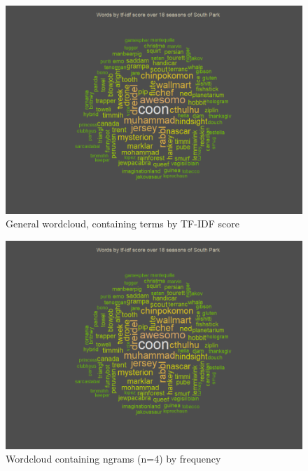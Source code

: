 \documentclass[10pt,a4paper]{article}
\begin{document}
	\begin{figure}[h]
	\centering
	\includegraphics[scale=0.9]{images/WordCloud-TFIDF.png}
	\caption{General wordcloud, containing terms by TF-IDF score}
	\label{fig:WordCloud-TFIDF}
	\end{figure}
	\begin{figure}[h]
	\centering
	\includegraphics[scale=0.9]{images/WordCloud-TFIDF.png}
	\caption{Wordcloud containing ngrams (n=4) by frequency}
	\label{fig:WordCloud-ngram}
	\end{figure}
	
\end{document}
